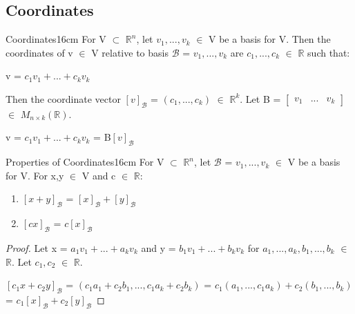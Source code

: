     \vspace{0.5cm}





\subsection{ Coordinates }

    \begin{definition}{Coordinates}{16cm}
        For V $\subset$ $\mathbb{R}^n$, let $v_1,...,v_k$ $\in$ V be
        a basis for V.
        Then the {\color{lblue} coordinates} of v $\in$ V relative to basis 
        $\mathcal{B}$ = $v_1,...,v_k$ are $c_1,...,c_k$ $\in$ $\mathbb{R}$
        such that:

        \hspace{0.5cm}
        v = $c_1v_1 + ... + c_kv_k$

        Then the {\color{lblue} coordinate vector}
        $[v]_{\mathcal{B}}$ = $(c_1,...,c_k)$ $\in$ $\mathbb{R}^k$.
        Let B =
        $\begin{bmatrix}
            v_1 & ... & v_k
        \end{bmatrix}$ $\in$ $M_{n \times k}(\mathbb{R})$.

        \hspace{0.5cm}
        v = $c_1v_1 + ... + c_kv_k$
        = B$[v]_{\mathcal{B}}$
    \end{definition}

    \vspace{0.5cm}



    \begin{wtheorem}{Properties of Coordinates}{16cm}
        For V $\subset$ $\mathbb{R}^n$, let $\mathcal{B}$ = $v_1,...,v_k$ $\in$ V
        be a basis for V. For x,y $\in$ V and c $\in$ $\mathbb{R}$:

        \begin{enumerate}[label=(\alph*), leftmargin=1cm, itemsep=0.1cm]
            \item $[x+y]_{\mathcal{B}}$ = $[x]_{\mathcal{B}} + [y]_{\mathcal{B}}$
            
            \item $[cx]_{\mathcal{B}}$ = $c[x]_{\mathcal{B}}$
        \end{enumerate}
    \end{wtheorem}

    \begin{proof}
        Let x = $a_1v_1 + ... + a_kv_k$
        and y = $b_1v_1 + ... + b_kv_k$
        for $a_1,...,a_k,b_1,...,b_k$ $\in$ $\mathbb{R}$.
        Let $c_1,c_2$ $\in$ $\mathbb{R}$.

        \hspace{0.5cm}
        $[c_1x+c_2y]_{\mathcal{B}}$
        = $(c_1a_1+c_2b_1,...,c_1a_k+c_2b_k)$
        = $c_1(a_1,...,c_1a_k) + c_2(b_1,...,b_k)$
        = $c_1[x]_{\mathcal{B}} + c_2[y]_{\mathcal{B}}$
    \end{proof}

